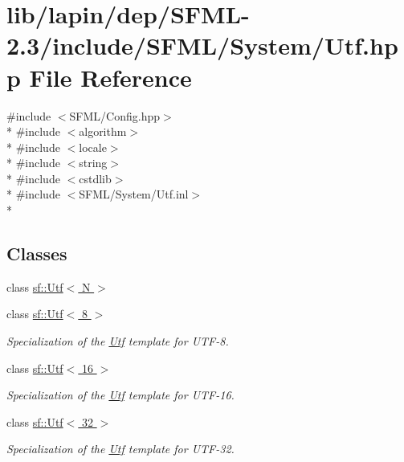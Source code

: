 \hypertarget{lapin_2dep_2_s_f_m_l-2_83_2include_2_s_f_m_l_2_system_2_utf_8hpp}{\section{lib/lapin/dep/\-S\-F\-M\-L-\/2.3/include/\-S\-F\-M\-L/\-System/\-Utf.hpp File Reference}
\label{lapin_2dep_2_s_f_m_l-2_83_2include_2_s_f_m_l_2_system_2_utf_8hpp}
}
{\ttfamily \#include $<$S\-F\-M\-L/\-Config.\-hpp$>$}\\*
{\ttfamily \#include $<$algorithm$>$}\\*
{\ttfamily \#include $<$locale$>$}\\*
{\ttfamily \#include $<$string$>$}\\*
{\ttfamily \#include $<$cstdlib$>$}\\*
{\ttfamily \#include $<$S\-F\-M\-L/\-System/\-Utf.\-inl$>$}\\*
\subsection*{Classes}
\begin{DoxyCompactItemize}
\item 
class \hyperlink{classsf_1_1_utf}{sf\-::\-Utf$<$ N $>$}
\item 
class \hyperlink{classsf_1_1_utf_3_018_01_4}{sf\-::\-Utf$<$ 8 $>$}
\begin{DoxyCompactList}\small\item\em Specialization of the \hyperlink{classsf_1_1_utf}{Utf} template for U\-T\-F-\/8. \end{DoxyCompactList}\item 
class \hyperlink{classsf_1_1_utf_3_0116_01_4}{sf\-::\-Utf$<$ 16 $>$}
\begin{DoxyCompactList}\small\item\em Specialization of the \hyperlink{classsf_1_1_utf}{Utf} template for U\-T\-F-\/16. \end{DoxyCompactList}\item 
class \hyperlink{classsf_1_1_utf_3_0132_01_4}{sf\-::\-Utf$<$ 32 $>$}
\begin{DoxyCompactList}\small\item\em Specialization of the \hyperlink{classsf_1_1_utf}{Utf} template for U\-T\-F-\/32. \end{DoxyCompactList}\end{DoxyCompactItemize}
